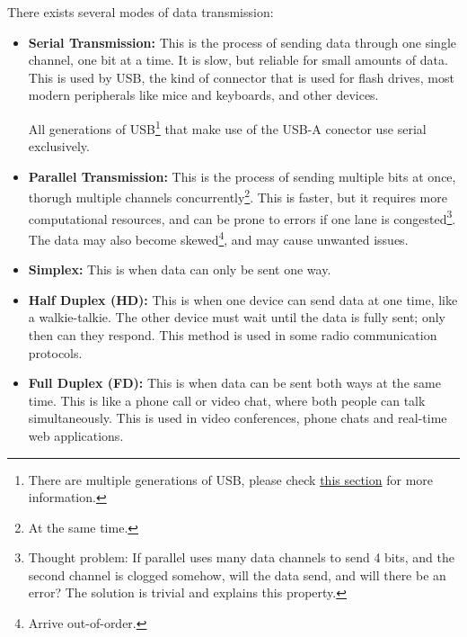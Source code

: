 \documentclass[../main.tex]{subfiles}
\begin{document}
There exists several modes of data transmission:

\begin{itemize}

\item \textbf{Serial Transmission:} This is the process of sending data through one single channel, one bit at a
    time. It is slow, but reliable for small amounts of data. This is used by USB, the kind of connector that is used for flash drives, most modern
    peripherals like mice and keyboards, and other devices.

    All generations of USB\footnote{There are multiple generations of USB, please check \hyperref[2:usb]{this section} for more information.} that
    make use of the USB-A conector use serial exclusively.

\item \textbf{Parallel Transmission:} This is the process of sending multiple bits at once, thorugh multiple channels concurrently\footnote{At the
    same time.}. This is faster, but it requires more computational resources, and can be prone to errors if one lane is congested\footnote{
    Thought problem: If parallel uses many data channels to send 4 bits, and the second channel is clogged somehow, will the data send, and will
    there be an error? The solution is trivial and explains this property.}. The data may also become skewed\footnote{Arrive out-of-order.}, and may
    cause unwanted issues.

\item \textbf{Simplex:} This is when data can only be sent one way.

\item \textbf{Half Duplex (HD):} This is when one device can send data at one time, like a walkie-talkie. The other device must wait until the data
    is fully sent; only then can they respond. This method is used in some radio communication protocols.

\item \textbf{Full Duplex (FD):} This is when data can be sent both ways at the same time. This is like a phone call or video chat, where both people can
    talk simultaneously. This is used in video conferences, phone chats and real-time web applications.

\end{itemize}
\end{document}
